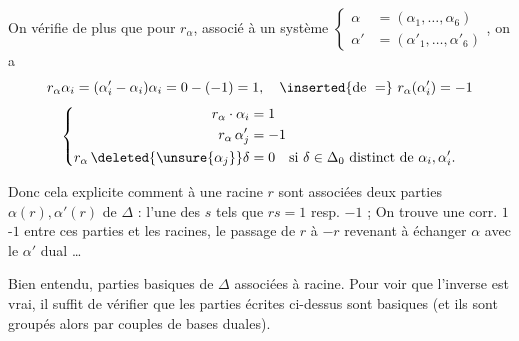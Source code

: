 On vérifie de plus que pour   $r_\alpha$, associé à un système
$\left\{\begin{aligned}\alpha&=(\alpha_1,\ldots,\alpha_6)\\\alpha'&=(\alpha'_1,\ldots,\alpha'_6)\end{aligned}\right.$, on a
\[
r_\alpha\alpha_i=(\alpha'_i-\alpha_i)\alpha_i=0-(-1)=1,\quad
\inserted{\text{de }=}\ r_\alpha(\alpha'_i)=-1
\]
\[
\left\{\begin{aligned}
r_\alpha\cdot\alpha_i&=1\\
r_\alpha\,\alpha'_j&=-1\\
r_\alpha\,\deleted{\unsure{\alpha_j}}\delta&=0\quad\text{si }\delta\in\Delta_0\text{ distinct de }\alpha_i,\alpha'_i .
\end{aligned}\right.
\]

Donc cela explicite  comment à une racine $r$ sont associées deux parties $\alpha(r),\alpha'(r)$ de $\Delta$ : l'une des $s$ \inserted{$\in\Delta$} tels que $rs=1$ resp. $-1$ ; On trouve une corr. $1$-$1$ entre ces parties \inserted{$\alpha$} et les  racines, le passage de $r$ à $-r$ revenant à échanger $\alpha$ avec le $\alpha'$ dual \ldots

Bien entendu,   parties basiques de $\Delta$  associées à   racine. Pour voir que l'inverse est vrai, il suffit de vérifier que les parties écrites ci-dessus  sont basiques (et ils sont groupés alors par couples de bases duales).

